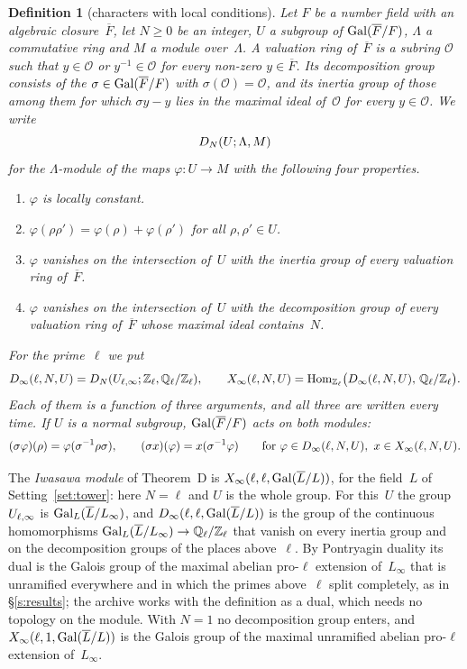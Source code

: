\documentclass[11pt,a4paper]{article}
\makeatletter
\newcommand{\lean}[1]{\csname LN@#1\endcsname}
\newcommand{\Z}{\mathbb{Z}}
\newcommand{\Hom}{\operatorname{Hom}}
\newcommand{\kw}[1]{\emph{#1}}
\newcommand{\m}[1]{\mbox{$#1$}}        %
\newcommand{\leantag}{{\sffamily\bfseries\fontsize{6.3}{8}\selectfont\color{leancol}\addfontfeatures{LetterSpace=7}LEAN}}
\newcommand{\leanline}[1]{\par\nopagebreak\vspace{-2.5pt}{\fontsize{8.9}{12.4}\selectfont\color{inksoft}\raggedright
  \noindent\llap{\leantag\hspace{9pt}}#1\par}\vspace{1pt}}
\theoremstyle{plainx}
\theoremstyle{uprightx}
\newtheorem{definition}[theorem]{Definition}
\makeatother
\begin{document}
\begin{definition}[characters with local conditions]\label{d:dinf}
Let $F$ be a number field with an algebraic closure~$\overline F$, let \m{N\ge0} be an integer, $U$ a subgroup of
\m{\GalG{F}{\overline F}}, $\Lambda$ a commutative ring and $M$ a module over~$\Lambda$. A \kw{valuation ring}
of~$\overline F$ is a subring $\mathcal O$ such that \m{y\in\mathcal O} or \m{y^{-1}\in\mathcal O} for every
non-zero \m{y\in\overline F}. Its \kw{decomposition group} consists of the \m{\sigma\in\GalG{F}{\overline F}} with
\m{\sigma(\mathcal O)=\mathcal O}, and its \kw{inertia group} of those among them for which \m{\sigma y-y} lies in
the maximal ideal of~$\mathcal O$ for every \m{y\in\mathcal O}. We write
\[
D_{N}(U;\Lambda,M)
\]
for the $\Lambda$-module of the maps \m{\varphi\colon U\to M} with the following four properties.
\begin{enumerate}[label=\textup{(\arabic*)},topsep=2pt,itemsep=1pt]
\item $\varphi$ is locally constant.
\item \m{\varphi(\rho\rho')=\varphi(\rho)+\varphi(\rho')} for all \m{\rho,\rho'\in U}.
\item $\varphi$ vanishes on the intersection of~$U$ with the inertia group of every valuation ring of~$\overline F$.
\item $\varphi$ vanishes on the intersection of~$U$ with the decomposition group of every valuation ring
of~$\overline F$ whose maximal ideal contains~$N$.
\end{enumerate}
For the prime~$\ell$ we put
\[
\Dinf{\ell}{N}{U}=\XDual{N}{\cycU{\ell}{U}}{\Z_\ell}{\QZl{\ell}},\qquad
\Xinf{\ell}{N}{U}=\Hom_{\Z_\ell}\bigl(\Dinf{\ell}{N}{U},\,\QZl{\ell}\bigr).
\]
Each of them is a function of three arguments, and all three are written every time. If $U$ is a normal subgroup,
\m{\GalG{F}{\overline F}} acts on both modules:
\[
(\sigma\varphi)(\rho)=\varphi(\sigma^{-1}\rho\sigma),\qquad(\sigma x)(\varphi)=x(\sigma^{-1}\varphi)
\qquad\text{for }\varphi\in D_\infty(\ell,N,U),\ x\in X_\infty(\ell,N,U).
\]
\end{definition}
\leanline{\lean{XDual}}

The \kw{Iwasawa module} of Theorem~D is \m{\Xinf{\ell}{\ell}{\GalG{L}{\overline L}}}, for the field~$L$ of
Setting~\ref{set:tower}: here \m{N=\ell} and $U$ is the whole group. For this~$U$ the group $U_{\ell,\infty}$ is
\m{\galOf{L}{L_\infty}{\overline L}}, and \m{\Dinf{\ell}{\ell}{\GalG{L}{\overline L}}} is the group of the continuous
homomorphisms \m{\galOf{L}{L_\infty}{\overline L}\to\QZl{\ell}} that vanish on every inertia group and on the
decomposition groups of the places above~$\ell$. By Pontryagin duality its dual is the Galois group of the maximal
abelian pro-$\ell$ extension of~$L_\infty$ that is unramified everywhere and in which the primes above~$\ell$ split
completely, as in §\ref{s:results}; the archive works with the definition as a dual, which needs no topology on the
module. With \m{N=1} no decomposition group enters, and \m{\Xinf{\ell}{1}{\GalG{L}{\overline L}}} is the Galois group
of the maximal unramified abelian pro-$\ell$ extension of~$L_\infty$.
\end{document}
